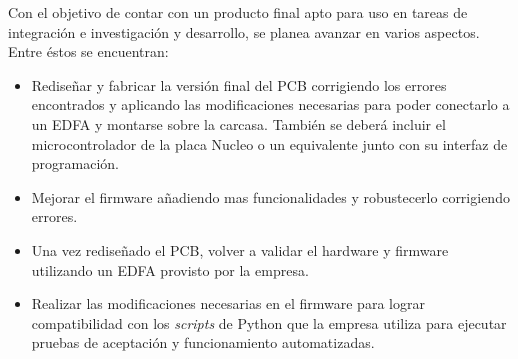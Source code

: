 Con el objetivo de contar con un producto final apto para uso en tareas de integración e investigación y desarrollo, se planea avanzar en varios aspectos. Entre éstos se encuentran:

\begin{itemize}
\item Rediseñar y fabricar la versión final del PCB corrigiendo los errores encontrados y aplicando las modificaciones necesarias para poder conectarlo a un EDFA y montarse sobre la carcasa. También se deberá incluir el microcontrolador de la placa Nucleo o un equivalente junto con su interfaz de programación.
\item Mejorar el firmware añadiendo mas funcionalidades y robustecerlo corrigiendo errores.
\item Una vez rediseñado el PCB, volver a validar el hardware y firmware utilizando un EDFA provisto por la empresa.
\item Realizar las modificaciones necesarias en el firmware para lograr compatibilidad con los \textit{scripts} de Python que la empresa utiliza para ejecutar pruebas de aceptación y funcionamiento automatizadas.
\end{itemize}